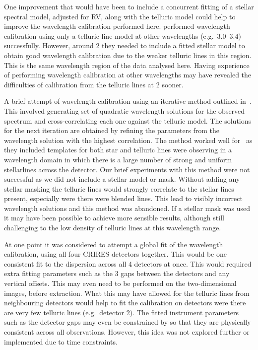 One improvement that would have been to include a concurrent fitting of a stellar spectral model, adjusted for {RV}, along with the telluric model could help to improve the wavelength calibration performed here. \citet{piskorz_evidence_2016} performed wavelength calibration using only a telluric line model at other \nir{} wavelengths {\red{} (e.g.\ 3.0--3.4\um{})} successfully. However, around 2\um{} they needed to include a fitted stellar model to obtain good wavelength calibration due to the weaker telluric lines in this region. This is the same wavelength region of the data analysed here. Having experience of performing wavelength calibration at other wavelengths may have revealed the difficulties of calibration from the telluric lines at 2\um{} sooner.

A brief attempt of wavelength calibration using an iterative method outlined in~\cite{brogi_rotation_2016}. This involved generating set of quadratic wavelength solutions for the observed spectrum and cross-correlating each one against the telluric model. The solutions for the next iteration are obtained by refining the parameters from the wavelength solution with the highest correlation. The method worked well for~\citet{brogi_rotation_2016} as they included templates for both star and telluric lines were observing in a wavelength domain in which there is a large number of strong and uniform stellarlines across the detector.
Our brief experiments with this method were not successful as we did not include a stellar model or mask. Without adding any stellar masking the telluric lines would strongly correlate to the stellar lines present, especially were there were blended lines. This lead to visibly incorrect wavelength solutions and this method was abandoned. If a stellar mask was used it may have been possible to achieve more sensible results, although still challenging to the low density of telluric lines at this wavelength range.





At one point it was considered to attempt a global fit of the wavelength calibration, using all four {CRIRES} detectors together. This would be one consistent fit to the dispersion across all 4 detectors at once. This would required extra fitting parameters such as the 3 gaps between the detectors and any vertical offsets. This may even need to be performed on the two-dimensional images, before extraction. What this may have allowed for the telluric lines from neighbouring detectors would help to fit the calibration on detectors were there are very few telluric lines (e.g.\ detector 2). The fitted instrument parameters such as the detector gaps may even be constrained by so that they are physically consistent across all observations. However, this idea was not explored further or implemented due to time constraints.


